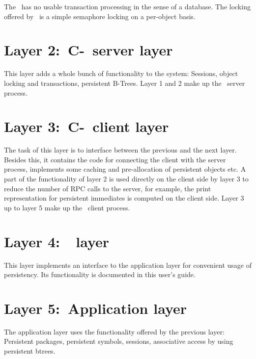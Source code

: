 The \postore\ has no usable transaction processing in the sense
of a database. The locking offered by \postore\ is a simple semaphore
locking on a per-object basis.

\section[C-PLOB server layer]%
{Layer 2:\ C-\protect\plob\ server layer}

This layer adds a whole bunch of functionality to the system:
Sessions, object locking and transactions, persistent B-Trees.
Layer 1 and 2 make up the \plob\ server process.

\section[C-PLOB client layer]%
{Layer 3:\ C-\protect\plob\ client layer}

The task of this layer is to interface between the previous and the
next layer. Besides this, it contains the code for connecting the
client with the server process, implements some caching and
pre-allocation of persistent objects etc.  A part of the functionality
of layer 2 is used directly on the client side by layer 3 to reduce
the number of RPC calls to the server, for example, the print
representation for persistent immediates is computed on the client
side. Layer 3 up to layer 5 make up the \plob\ client process.

\section[PLOB layer]%
{Layer 4:\ \protect\plob\ layer}

This layer implements an interface to the application layer for
convenient usage of persistency. Its functionality is documented in
this user's guide.

\section[Application layer]%
{Layer 5:\ Application layer}

The application layer uses the functionality offered by the previous
layer: Persistent packages, persistent symbols, sessions, associative
access by using persistent btrees.

\clearpage\thispagestyle{plain}\cleardoublepage%

